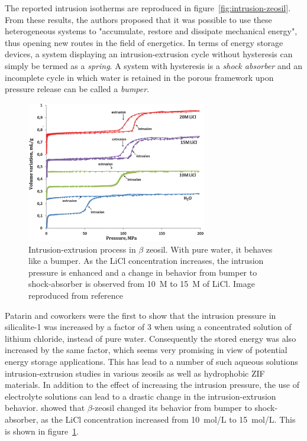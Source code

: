 \documentclass[thesis]{subfiles}
\begin{document}
The reported intrusion isotherms are reproduced in
figure~\ref{fig:intrusion-zeosil}. From these results, the authors proposed that
it was possible to use these heterogeneous systems to "accumulate, restore and
dissipate mechanical energy", thus opening new routes in the field of
energetics. In terms of energy storage devices, a system displaying an
intrusion-extrusion cycle without hysteresis can simply be termed as a
\emph{spring}. A system with hysteresis is a \emph{shock absorber} and an
incomplete cycle in which water is retained in the porous framework upon
pressure release can be called a \emph{bumper}.

\begin{figure}[ht]
    \centering
    \includegraphics[width=0.7\textwidth]{figures/cited/intrusion-licl}
    \caption{Intrusion-extrusion process in $\beta$ zeosil. With pure water, it
    behaves like a bumper. As the LiCl concentration increases, the intrusion
    pressure is enhanced and a change in behavior from bumper to shock-absorber
    is observed from 10~M to 15~M of LiCl. Image reproduced from
    reference~\cite{Ryzhikov2014}}
    \label{fig:intrusion-licl}
\end{figure}

Patarin and coworkers\cite{Tzanis2014, Khay2014} were the first to show that the
intrusion pressure in silicalite-1 was increased by a factor of 3 when using a
concentrated solution of lithium chloride, instead of pure water. Consequently
the stored energy was also increased by the same factor, which seems very
promising in view of potential energy storage applications. This has lead to a
number of such aqueous solutions intrusion-extrusion studies in various zeosils
as well as hydrophobic ZIF materials. In addition to the effect of increasing
the intrusion pressure, the use of electrolyte solutions can lead to a drastic
change in the intrusion-extrusion behavior.
\citeauthor{Ryzhikov2014}\cite{Ryzhikov2014} showed that $\beta$-zeosil changed
its behavior from bumper to shock-absorber, as the LiCl concentration increased
from \SI{10}{mol/L} to \SI{15}{mol/L}. This is shown in
figure~\ref{fig:intrusion-licl}.
\end{document}
